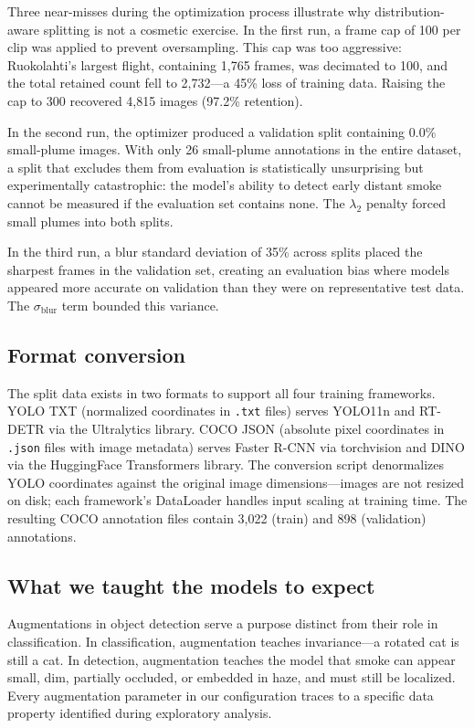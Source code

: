 \documentclass[10pt,twocolumn]{article}
\begin{document}
Three near-misses during the optimization process illustrate why distribution-aware splitting is not a cosmetic exercise. In the first run, a frame cap of 100 per clip was applied to prevent oversampling. This cap was too aggressive: Ruokolahti's largest flight, containing 1,765 frames, was decimated to 100, and the total retained count fell to 2,732---a 45\% loss of training data. Raising the cap to 300 recovered 4,815 images (97.2\% retention).

In the second run, the optimizer produced a validation split containing 0.0\% small-plume images. With only 26 small-plume annotations in the entire dataset, a split that excludes them from evaluation is statistically unsurprising but experimentally catastrophic: the model's ability to detect early distant smoke cannot be measured if the evaluation set contains none. The \(\lambda_2\) penalty forced small plumes into both splits.

In the third run, a blur standard deviation of 35\% across splits placed the sharpest frames in the validation set, creating an evaluation bias where models appeared more accurate on validation than they were on representative test data. The \(\sigma_{\text{blur}}\) term bounded this variance.

\subsection{Format conversion}

The split data exists in two formats to support all four training frameworks. YOLO TXT (normalized coordinates in \texttt{.txt} files) serves YOLO11n and RT-DETR via the Ultralytics library. COCO JSON (absolute pixel coordinates in \texttt{.json} files with image metadata) serves Faster R-CNN via torchvision and DINO via the HuggingFace Transformers library. The conversion script denormalizes YOLO coordinates against the original image dimensions---images are not resized on disk; each framework's DataLoader handles input scaling at training time. The resulting COCO annotation files contain 3,022 (train) and 898 (validation) annotations.

\subsection{What we taught the models to expect}

Augmentations in object detection serve a purpose distinct from their role in classification. In classification, augmentation teaches invariance---a rotated cat is still a cat. In detection, augmentation teaches the model that smoke can appear small, dim, partially occluded, or embedded in haze, and must still be localized. Every augmentation parameter in our configuration traces to a specific data property identified during exploratory analysis.
\end{document}

